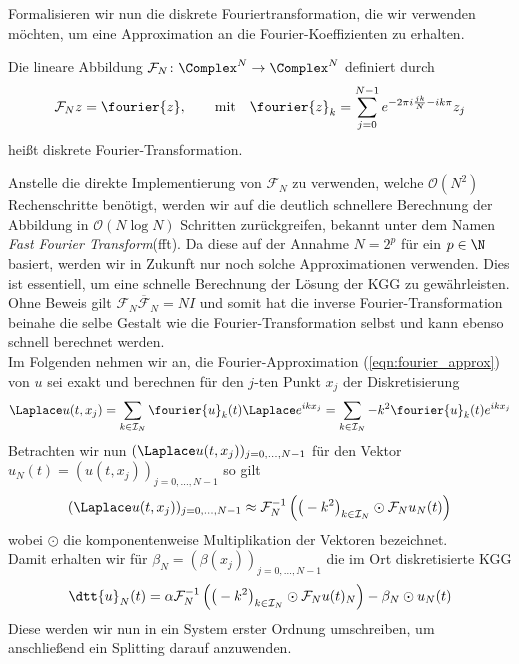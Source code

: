 Formalisieren wir nun die diskrete Fouriertransformation, die wir verwenden möchten, um eine Approximation an die Fourier-Koeffizienten zu erhalten.
\begin{mathdef}
Die lineare Abbildung $\mathcal{F}_N\colon\Complex^N\to\Complex^N$ definiert durch
\[\mathcal{F}_Nz=\fourier{z},\qquad\text{mit}\quad \fourier{z}_k=\sum_{j=0}^{N-1}e^{-2\pi i\frac{jk}{N}-ik\pi}z_j\]
heißt diskrete Fourier-Transformation.
\end{mathdef}
Anstelle die direkte Implementierung von $\mathcal{F}_N$ zu verwenden, welche $\mathcal{O}(N^2)$ Rechenschritte benötigt, werden wir auf die deutlich schnellere Berechnung der Abbildung in $\mathcal{O}(N\log N)$ Schritten zurückgreifen, bekannt unter dem Namen \emph{Fast Fourier Transform}(fft). Da diese auf der Annahme $N=2^p$ für ein $p\in\N$ basiert, werden wir in Zukunft nur noch solche Approximationen verwenden. Dies ist essentiell, um eine schnelle Berechnung der Lösung der KGG zu gewährleisten. Ohne Beweis gilt $\mathcal{F}_N\overline{\mathcal{F}}_N=NI$ und somit hat die inverse Fourier-Transformation beinahe die selbe Gestalt wie die Fourier-Transformation selbst und kann ebenso schnell berechnet werden.\\
Im Folgenden nehmen wir an, die Fourier-Approximation (\ref{eqn:fourier_approx}) von $u$ sei exakt und berechnen für den $j$-ten Punkt $x_j$ der Diskretisierung
\begin{equation}
\label{eqn:laplace_approxu}
\Laplace u(t,x_j)=\sum_{k\in\mathcal{I}_N}\fourier{u}_k(t)\Laplace e^{ikx_j}=\sum_{k\in\mathcal{I}_N}-k^2\fourier{u}_k(t)e^{ikx_j}
\end{equation}
Betrachten wir nun $(\Laplace u(t,x_j))_{j=0,\dots,N-1}$ für den Vektor $u_N(t)=(u(t,x_j))_{j=0,\dots,N-1}$ so gilt
\[(\Laplace u(t,x_j))_{j=0,\dots,N-1}\approx \mathcal{F}_N^{-1}\left(\big(-k^2\big)_{k\in\mathcal{I}_N}\odot\mathcal{F}_Nu_N(t)\right)\]
wobei $\odot$ die komponentenweise Multiplikation der Vektoren bezeichnet.\\
Damit erhalten wir für $\beta_N=(\beta(x_j))_{j=0,\dots,N-1}$ die im Ort diskretisierte KGG
\begin{equation}
\label{eqn:kgg_discretespace}
\dtt{u}_N(t)=\alpha \mathcal{F}_N^{-1}\left(\big(-k^2\big)_{k\in\mathcal{I}_N}\odot\mathcal{F}_Nu(t)_N\right) -\beta_N\odot u_N(t)
\end{equation}
Diese werden wir nun in ein System erster Ordnung umschreiben, um anschließend ein Splitting darauf anzuwenden. 

